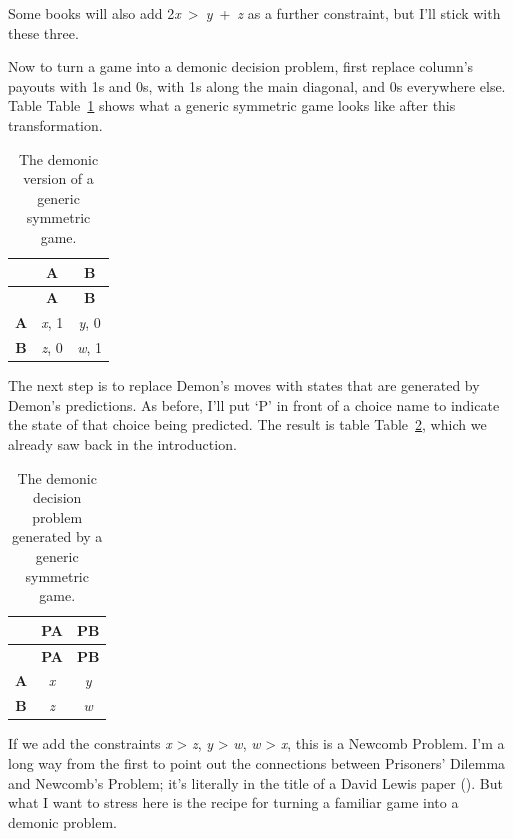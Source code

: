 \documentclass[
  12pt,
  letterpaper,
  DIV=11,
  numbers=noendperiod]{scrreprt}
\begin{document}
Some books will also add 2\emph{x}~\textgreater~\emph{y}~+~\emph{z} as a
further constraint, but I'll stick with these three.

Now to turn a game into a demonic decision problem, first replace
column's payouts with 1s and 0s, with 1s along the main diagonal, and 0s
everywhere else. Table Table~\ref{tbl-demon-sym-game} shows what a
generic symmetric game looks like after this transformation.

\begin{longtable}[]{@{}ccc@{}}
\caption{The demonic version of a generic symmetric
game.}\label{tbl-demon-sym-game}\tabularnewline
\toprule\noalign{}
& \textbf{A} & \textbf{B} \\
\midrule\noalign{}
\endfirsthead
\toprule\noalign{}
& \textbf{A} & \textbf{B} \\
\midrule\noalign{}
\endhead
\bottomrule\noalign{}
\endlastfoot
\textbf{A} & \emph{x}, 1 & \emph{y}, 0 \\
\textbf{B} & \emph{z}, 0 & \emph{w}, 1 \\
\end{longtable}

The next step is to replace Demon's moves with states that are generated
by Demon's predictions. As before, I'll put `P' in front of a choice
name to indicate the state of that choice being predicted. The result is
table Table~\ref{tbl-gen-dem-problem}, which we already saw back in the
introduction.

\begin{longtable}[]{@{}ccc@{}}
\caption{The demonic decision problem generated by a generic symmetric
game.}\label{tbl-gen-dem-problem}\tabularnewline
\toprule\noalign{}
& \textbf{PA} & \textbf{PB} \\
\midrule\noalign{}
\endfirsthead
\toprule\noalign{}
& \textbf{PA} & \textbf{PB} \\
\midrule\noalign{}
\endhead
\bottomrule\noalign{}
\endlastfoot
\textbf{A} & \emph{x} & \emph{y} \\
\textbf{B} & \emph{z} & \emph{w} \\
\end{longtable}

If we add the constraints \emph{x} \textgreater{} \emph{z}, \emph{y}
\textgreater{} \emph{w}, \emph{w} \textgreater{} \emph{x}, this is a
Newcomb Problem. I'm a long way from the first to point out the
connections between Prisoners' Dilemma and Newcomb's Problem; it's
literally in the title of a David Lewis paper
(). But what I want to stress here
is the recipe for turning a familiar game into a demonic problem.
\end{document}
